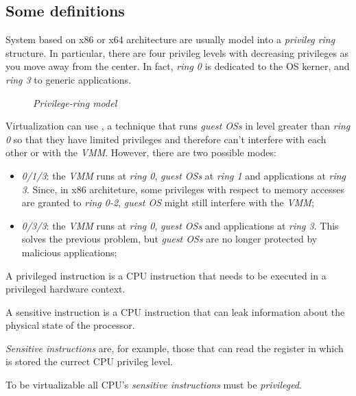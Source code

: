 \subsection{Some definitions}
System based on x86 or x64 architecture are usually model into a \emph{privileg
ring} structure. In particular, there are four privileg levels with decreasing
privileges as you move away from the center. In fact, \emph{ring 0} is dedicated
to the OS kerner, and \emph{ring 3} to generic applications.

\begin{figure}[h!]
    \centering
    \caption{\emph{Privilege-ring model}}
\end{figure}

\noindent
Virtualization can use , a technique that runs
\emph{guest OSs} in level greater than \emph{ring 0} so that they have
limited privileges and therefore can't interfere with each other or with the
\emph{VMM}. However, there
are two possible modes:
\begin{itemize}
    \item\emph{0/1/3}: the \emph{VMM} runs at \emph{ring 0}, \emph{guest OSs}
    at \emph{ring 1} and applications at \emph{ring 3}. Since, in x86 architeture,
    some privileges with respect to memory accesses are granted to \emph{ring 0-2},
    \emph{guest OS} might still interfere with the \emph{VMM};
    \item\emph{0/3/3}: the \emph{VMM} runs at \emph{ring 0}, \emph{guest OSs}
    and applications at \emph{ring 3}. This solves the previous problem, but
    \emph{guest OSs} are no longer protected by malicious applications;
\end{itemize}

\begin{definition}
    A privileged instruction is a CPU instruction that needs to be executed in
    a privileged hardware context.
\end{definition}
\begin{definition}
    A sensitive instruction is a CPU instruction that can leak information about
    the physical state of the processor.
\end{definition}
\begin{note}
    \emph{Sensitive instructions} are, for example, those that can read the
    register in which is stored the currect CPU privileg level.
\end{note}\noindent
To be virtualizable all CPU's \emph{sensitive instructions} must be
\emph{privileged}.

